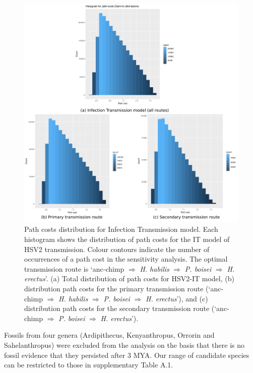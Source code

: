\documentclass[fleqn,10pt]{wlscirep}
\begin{document}
\begin{figure}
  \centering
  \includegraphics[width=\textwidth]{figs/gamm_path_costs}
  \caption{Path costs distribution for Infection Transmission model. Each histogram shows the distribution of path costs for the IT model of HSV2 transmission. Colour contours indicate the number of occurrences of a path cost in the sensitivity analysis. The optimal transmission route is ‘anc-chimp $\Rightarrow$ \textit{H. habilis} $\Rightarrow$ \textit{P. boisei} $\Rightarrow$ \textit{H. erectus}’. (a) Total distribution of path costs for HSV2-IT model, (b) distribution path costs for the primary transmission route (‘anc-chimp $\Rightarrow$ \textit{H. habilis} $\Rightarrow$ \textit{P. boisei} $\Rightarrow$ \textit{H. erectus}’), and (c) distribution path costs for the  secondary transmission route (‘anc-chimp $\Rightarrow$ \textit{P. boisei} $\Rightarrow$ \textit{H. erectus}’).}
  \label{fig:gamma}   
\end{figure}     



Fossils from four genera (Ardipithecus, Kenyanthropus, Orrorin and Sahelanthropus) were excluded from the analysis on the basis that there is no fossil evidence that they persisted after 3 MYA. Our range of candidate species can be restricted to those in supplementary Table A.1.
\end{document}
